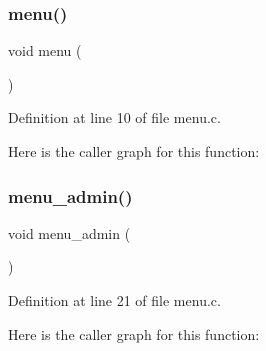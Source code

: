 \subsubsection{menu()}
{\footnotesize\ttfamily void menu (\begin{DoxyParamCaption}{ }\end{DoxyParamCaption})}



Definition at line 10 of file menu.\+c.

Here is the caller graph for this function\+:
\mbox{\label{menu_8c_a00990449875fc238baa27ecdb95d24b6}} 
\subsubsection{menu\+\_\+admin()}
{\footnotesize\ttfamily void menu\+\_\+admin (\begin{DoxyParamCaption}{ }\end{DoxyParamCaption})}



Definition at line 21 of file menu.\+c.

Here is the caller graph for this function\+:
